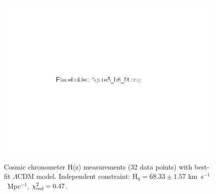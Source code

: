 \documentclass[twocolumn, linenumbers]{aastex701}
\begin{document}
\begin{figure}
\includegraphics[width=\columnwidth]{../figures/figure5_h6_fit.png}
\caption{Cosmic chronometer H(z) measurements (32 data points) with best-fit
$\Lambda$CDM model. Independent constraint: H$_0 = 68.33 \pm 1.57$ km~s$^{-1}$~Mpc$^{-1}$,
$\chi^2_{\rm red} = 0.47$.}
\label{fig:h6}
\end{figure}








\end{document}
